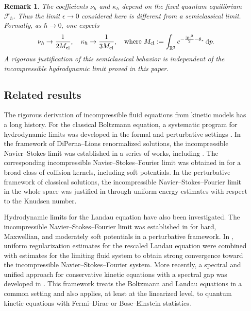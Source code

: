 \documentclass[10pt,reqno]{amsart}
\numberwithin{equation}{section}
\newtheorem{remark}{Remark}[section]
\newcommand{\mR}{\mathbb{R}}
\newcommand{\intr}{\int_{\mR^3}}
\newcommand{\calF}{\mathcal F}
\newcommand{\rdp}{\textnormal{d}p}
\begin{document}
\begin{remark} 
The coefficients $\nu_\hbar$ and $\kappa_\hbar$ depend on the fixed quantum equilibrium $\calF_\hbar$. Thus the limit $\epsilon\to0$ considered here is different from a semiclassical limit. Formally, as $\hbar\to0$, one expects
\[
\nu_\hbar\to\frac{1}{2M_{\rm cl}},\quad \kappa_\hbar\to\frac{1}{3M_{\rm cl}}, \quad \text{where } M_{\rm cl}:=\intr e^{-\frac{|p|^2}{2}-\theta_*}\,\rdp.
\]
A rigorous justification of this semiclassical behavior is independent of the incompressible hydrodynamic limit proved in this paper.
\end{remark}


%
%
%
%
%
%
%
%
%
%
\subsection{Related results} 

The rigorous derivation of incompressible fluid equations from kinetic models has a long history. For the classical Boltzmann equation, a systematic program for hydrodynamic limits was developed in the formal and perturbative settings \cite{BGL91,BGL93}. In the framework of DiPerna--Lions renormalized solutions, the incompressible Navier--Stokes limit was established in a series of works, including \cite{GS04,GS09}. The corresponding incompressible Navier--Stokes--Fourier limit was obtained in \cite{LM10} for a broad class of collision kernels, including soft potentials. In the perturbative framework of classical solutions, the incompressible Navier--Stokes--Fourier limit in the whole space was justified in \cite{JXZ18} through uniform energy estimates with respect to the Knudsen number.

Hydrodynamic limits for the Landau equation have also been investigated. The incompressible Navier--Stokes--Fourier limit was established in \cite{Rac21} for hard, Maxwellian, and moderately soft potentials in a perturbative framework. In \cite{CRT22}, uniform regularization estimates for the rescaled Landau equation were combined with estimates for the limiting fluid system to obtain strong convergence toward the incompressible Navier--Stokes--Fourier system. More recently, a spectral and unified approach for conservative kinetic equations with a spectral gap was developed in \cite{GL24}. This framework treats the Boltzmann and Landau equations in a common setting and also applies, at least at the linearized level, to quantum kinetic equations with Fermi--Dirac or Bose--Einstein statistics.
\end{document}
